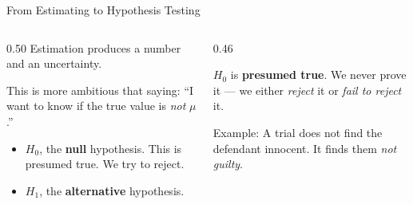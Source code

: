 \documentclass[9pt,english,aspectratio=169]{beamer}
\begin{document}
\begin{frame}{From Estimating to Hypothesis Testing}

  \begin{columns}[T]
    \begin{column}{0.50\textwidth}
      \vspace{0.3em}
      Estimation produces a number and an uncertainty.\vspace{1em}
      
      This is more ambitious that saying: ``I want to know if the true value is \textit{not} $\mu$.''

      \vspace{0.5em}
      \begin{definitionbox}
        \begin{itemize}
          \item $H_0$, the \textbf{null} hypothesis. This is presumed true. We try to reject.
          
          \item $H_1$, the \textbf{alternative} hypothesis.  
        \end{itemize}
      \end{definitionbox}
    \end{column}
    \begin{column}{0.46\textwidth}
      \vspace{1.1em}
      \pause
      \begin{insightbox}
        $H_0$ is \textbf{presumed true}. We never prove it --- we either \textit{reject} it or \textit{fail to reject} it.
      \end{insightbox}
      \pause

      \vspace{0.5em}
      \begin{quotebox}
       Example: A trial does not find the defendant innocent. It finds them \emph{not guilty}. 
      \end{quotebox}
    \end{column}
  \end{columns}



\end{frame}
\end{document}
